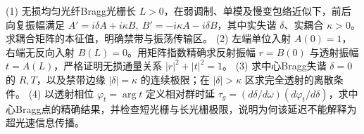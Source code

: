 (1) 无损均匀光纤Bragg光栅长 \(L>0\)，在弱调制、单模及慢变包络近似下，前后向复振幅满足 \(A'=i\delta A+i\kappa B,\ B'=-i\kappa A-i\delta B\)，其中实失谐 \(\delta\)、实耦合 \(\kappa>0\)。求耦合矩阵的本征值，明确禁带与振荡传输区。
(2) 左端单位入射 \(A(0)=1\)，右端无反向入射 \(B(L)=0\)。用矩阵指数精确求反射振幅 \(r=B(0)\) 与透射振幅 \(t=A(L)\)，严格证明无损通量关系 \(|r|^2+|t|^2=1\)。
(3) 求中心Bragg失谐 \(\delta=0\) 的 \(R,T\)，以及禁带边缘 \(|\delta|=\kappa\) 的连续极限；在 \(|\delta|>\kappa\) 区求完全透射的离散条件。
(4) 以透射相位 \(\varphi_t=\arg t\) 定义相对群时延 \(\tau_g=(d\delta/d\omega)(d\varphi_t/d\delta)\)，求中心Bragg点的精确结果，并检查短光栅与长光栅极限，说明为何该延迟不能解释为超光速信息传播。
